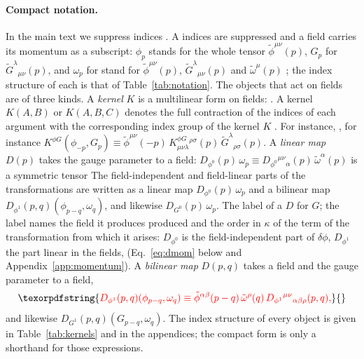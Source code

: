 \documentclass[prd,aps,preprint,superscriptaddress,nofootinbib,amsmath,amssymb,eqsecnum]{revtex4-2}
\newcommand{\tomega}{\tilde{\omega}}
\newcommand{\p}{\tilde{\phi}}
\newcommand{\G}{\tilde{G}}
\providecommand{\DIFaddtex}[1]{{\protect\color{blue} \sf #1}} %
\providecommand{\DIFdeltex}[1]{{\protect\color{red} \scriptsize #1}} %
\providecommand{\DIFaddbegin}{} %
\providecommand{\DIFaddend}{} %
\providecommand{\DIFdelbegin}{} %
\providecommand{\DIFdelend}{} %
\providecommand{\DIFadd}[1]{\texorpdfstring{\DIFaddtex{#1}}{#1}} %
\providecommand{\DIFdel}[1]{\texorpdfstring{\DIFdeltex{#1}}{}} %
\begin{document}
\paragraph{Compact notation.} In the main text \DIFdelbegin \DIFdel{we suppress indices . A }\DIFdelend \DIFaddbegin \DIFadd{indices are suppressed and a }\DIFaddend field carries
its momentum as a subscript: $\phi_p$\DIFdelbegin \DIFdel{stands for the whole tensor
$\p^{\mu\nu}(p)$}\DIFdelend , $G_p$ \DIFdelbegin \DIFdel{for $\G^{\lambda}{}_{\mu\nu}(p)$, }\DIFdelend \DIFaddbegin \DIFadd{and }\DIFaddend $\omega_p$ \DIFdelbegin \DIFdel{for }\DIFdelend \DIFaddbegin \DIFadd{stand for $\p^{\mu\nu}(p)$,
$\G^{\lambda}{}_{\mu\nu}(p)$ and }\DIFaddend $\tomega^\mu(p)$\DIFdelbegin \DIFdel{;
the index structure of each is that of Table~\ref{tab:notation}. The objects that act on
fields are of three kinds.
}%
\DIFdel{A \emph{kernel} $K$ is a multilinear form on fields: }\DIFdelend \DIFaddbegin \DIFadd{. A kernel }\DIFaddend $K(A,B)$ or $K(A,B,C)$ denotes the
full contraction of \DIFdelbegin \DIFdel{the indices of }\DIFdelend each argument with the corresponding index group of \DIFdelbegin \DIFdel{the kernel }\DIFdelend $K$\DIFdelbegin \DIFdel{.
For instance, }\DIFdelend \DIFaddbegin \DIFadd{, for instance
}\DIFaddend $K^{\phi G}(\phi_{-p},G_p)\equiv\p^{\mu\nu}(-p)\,K^{\phi G}_{\mu\nu\lambda}{}^{\rho\sigma}(p)\,\G^{\lambda}{}_{\rho\sigma}(p)$.
\DIFdelbegin %
\DIFdel{A \emph{linear map} $D(p)$ takes the gauge parameter to a field:
$D_{\phi^0}(p)\,\omega_p\equiv D_{\phi^0}{}^{\mu\nu}{}_{\alpha}(p)\,\tomega^\alpha(p)$ is a symmetric tensor}\DIFdelend \DIFaddbegin \DIFadd{The field-independent and field-linear parts of the transformations are written as a linear
map $D_{\phi^0}(p)\,\omega_p$ and a bilinear map $D_{\phi^1}(p,q)(\phi_{p-q},\omega_q)$}\DIFaddend , and
likewise \DIFdelbegin \DIFdel{$D_{G^0}(p)\,\omega_p$. The label of a $D$ }\DIFdelend \DIFaddbegin \DIFadd{for $G$; the label }\DIFaddend names the field \DIFdelbegin \DIFdel{it
produces }\DIFdelend \DIFaddbegin \DIFadd{produced }\DIFaddend and the order in $\kappa$
\DIFdelbegin \DIFdel{of the term of the transformation from which it arises:
$D_{\phi^0}$ is the field-independent part of $\delta\phi$, $D_{\phi^1}$ the part linear in
the fields, }\DIFdelend \DIFaddbegin \DIFadd{(}\DIFaddend Eq.~\eqref{eq:dmom} below \DIFaddbegin \DIFadd{and Appendix~\ref{app:momentum})}\DIFaddend .
\DIFdelbegin %
\DIFdel{A \emph{bilinear map} $D(p,q)$ takes a field and the gauge parameter to a field,
}\[
\DIFdel{D_{\phi^1}(p,q)(\phi_{p-q},\omega_q)\equiv\p^{\alpha\beta}(p-q)\,\tomega^\rho(q)\,
D_{\phi^1}{}^{\mu\nu}{}_{\alpha\beta\rho}(p,q),
}\]%
\DIFdel{and likewise $D_{G^1}(p,q)(G_{p-q},\omega_q)$.
}%
\DIFdel{The index structure of every object is given in Table~\ref{tab:kernels} and in the
appendices; the compact form is only a shorthand for those expressions.
}\DIFdelend 
\end{document}
